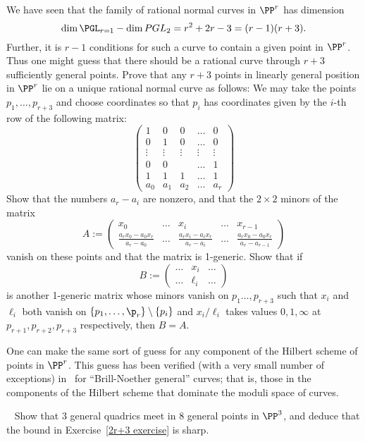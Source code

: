 \begin{exercise}\label{r+3 exercise}
We have seen that the family of rational normal curves in $\PP^{r}$ has dimension 
$$
\dim \PGL_{r=1} - \dim PGL_{2} = r^{2}+2r-3 = (r-1)(r+3).
$$
Further, it is $r-1$ conditions for such a curve to contain a given point in $\PP^{r}$. Thus one might guess
that there should be a rational curve through $r+3$ sufficiently general points. 
Prove that any $r+3$ points in linearly general position in $\PP^r$ lie on a unique rational normal curve as follows:
 We may take the points $p_1,\dots,p_{r+3}$ and choose coordinates so that $p_i$ has coordinates given by the $i$-th row of the following matrix:
$$
\begin{pmatrix}
 1&0&0&\dots&0\\
 0&1&0&\dots&0\\
 \vdots &\vdots&\vdots&\vdots&\vdots \\
 0&0&&\dots&1\\
 1&1&1&\dots&1\\
 a_0&a_1&a_2&\dots&a_{r}
 \end{pmatrix}
$$
Show that the numbers $a_r-a_i$ are nonzero, and that the $2\times 2$ minors of the matrix
$$
A := \begin{pmatrix}
 x_0&\dots&x_i&\dots& x_{r-1}\\
\frac{a_rx_0-a_0x_r}{a_r-a_0}&\dots&\frac{a_rx_i-a_ix_r}{a_r-a_i}&\dots&\frac{a_rx_0-a_0x_r}{a_r-a_{r-1}} 
\end{pmatrix}
$$
vanish on these points and that the matrix is 1-generic. Show that if 
$$
B:= \begin{pmatrix}
 \dots& x_i&\dots\\
 \dots& \ell_i &\dots
\end{pmatrix}
$$
is another 1-generic matrix whose minors vanish on $p_1\dots, p_{r+3}$ such that $x_i$ and $\ell_i$ both vanish on
$\{p_1,\dots, \p_r\} \setminus \{p_i\}$ and
$x_i/\ell_i$ takes values $0,1,\infty$ at $p_{r+1},p_{r+2},p_{r+3}$ respectively, then $B= A$.

One can make the same sort of guess for any component of the Hilbert scheme of points in $\PP^{r}$. This guess has
 been verified (with a very small number of exceptions) in~\cite{MR4220034} for ``Brill-Noether general'' curves;
that is, those in the components
of the Hilbert scheme that dominate the moduli space of curves.
\end{exercise}


\begin{exercise}~\label{2r+3 is sharp}
Show that 3 general quadrics meet in 8 general points in $\PP^3$, and deduce that the bound in Exercise~\ref{2r+3 exercise}
is sharp.
\end{exercise}

